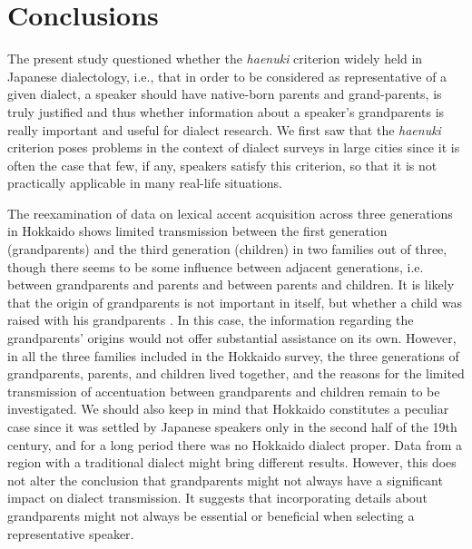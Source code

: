 \documentclass[output=paper,colorlinks,citecolor=brown]{langscibook}
\begin{document}
\section{Conclusions}

The present study questioned whether the \emph{haenuki} criterion widely held in Japanese dialectology, i.e., that in order to be considered as representative of a given dialect, a speaker should have native-born parents and grand-parents, is truly justified and thus whether information about a speaker's grandparents is really important and useful for dialect research. We first saw that the \emph{haenuki} criterion poses problems in the context of dialect surveys in large cities since it is often the case that few, if any, speakers satisfy this criterion, so that it is not practically applicable in many real-life situations.

\begin{sloppypar}
The reexamination of data on lexical accent acquisition across three generations in Hokkaido shows limited transmission between the first generation (grandparents) and the third generation (children) in two families out of three, though there seems to be some influence between adjacent generations, i.e. between grandparents and parents and between parents and children. It is likely that the origin of grandparents is not important in itself, but whether a child was raised with his grandparents \citep{InoueHanzawa2022}. In this case, the information regarding the grandparents' origins would not offer substantial assistance on its own. However, in all the three families included in the Hokkaido survey, the three generations of grandparents, parents, and children lived together, and the reasons for the limited transmission of accentuation between grandparents and children remain to be investigated. We should also keep in mind that Hokkaido constitutes a peculiar case since it was settled by Japanese speakers only in the second half of the 19th century, and for a long period there was no Hokkaido dialect proper. Data from a region with a traditional dialect might bring different results. However, this does not alter the conclusion that grandparents might not always have a significant impact on dialect transmission. It suggests that incorporating details about grandparents might not always be essential or beneficial when selecting a representative speaker.
\end{sloppypar}
\end{document}
